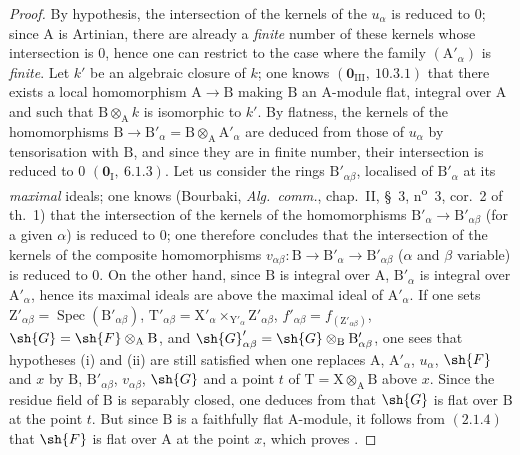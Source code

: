 \begin{proof}
By hypothesis, the intersection of the kernels of the $u_\alpha$ is reduced to $0$; since $\mathrm{A}$ is Artinian,
there are already a \emph{finite} number of these kernels whose intersection is $0$, hence one can
restrict to the case where the family $(\mathrm{A}'_\alpha)$ is \emph{finite}. Let $k'$ be an algebraic closure of $k$; one knows
$(\mathbf{0}_{\mathrm{III}},~10.3.1)$ that there exists a local homomorphism $\mathrm{A}\to\mathrm{B}$ making $\mathrm{B}$ an $\mathrm{A}$-module
flat, integral over $\mathrm{A}$ and such that $\mathrm{B}\otimes_\mathrm{A} k$ is isomorphic to $k'$.
By flatness, the kernels of the homomorphisms $\mathrm{B}\to\mathrm{B}'_\alpha=\mathrm{B}\otimes_\mathrm{A}\mathrm{A}'_\alpha$ are deduced from those of
$u_\alpha$ by tensorisation with $\mathrm{B}$, and since they are in finite number, their intersection is
reduced to $0$ $(\mathbf{0}_\mathrm{I},~6.1.3)$. Let us consider the rings $\mathrm{B}'_{\alpha\beta}$, localised of $\mathrm{B}'_\alpha$ at its \emph{maximal} ideals;
one knows (Bourbaki, \emph{Alg.\ comm.}, chap.~II, \S~3, n\textsuperscript{o}~3, cor.~2 of th.~1) that the intersection
of the kernels of the homomorphisms $\mathrm{B}'_\alpha\to\mathrm{B}'_{\alpha\beta}$ (for a given $\alpha$) is reduced to $0$; one therefore concludes
that the intersection of the kernels of the composite homomorphisms $v_{\alpha\beta}:\mathrm{B}\to\mathrm{B}'_\alpha\to\mathrm{B}'_{\alpha\beta}$ ($\alpha$ and
$\beta$ variable) is reduced to $0$. On the other hand, since $\mathrm{B}$ is integral over $\mathrm{A}$, $\mathrm{B}'_\alpha$ is integral over $\mathrm{A}'_\alpha$,
hence its maximal ideals are above the maximal ideal of $\mathrm{A}'_\alpha$. If one sets
$\mathrm{Z}'_{\alpha\beta}=\operatorname{Spec}(\mathrm{B}'_{\alpha\beta})$,
$\mathrm{T}'_{\alpha\beta}=\mathrm{X}'_\alpha\times_{\mathrm{Y}'_\alpha}\mathrm{Z}'_{\alpha\beta}$,
$f'_{\alpha\beta}=f_{(\mathrm{Z}'_{\alpha\beta})}$,
$\sh{G}=\sh{F}\otimes_\mathrm{A}\mathrm{B}$, and
$\sh{G}'_{\alpha\beta}=\sh{G}\otimes_\mathrm{B}\mathrm{B}'_{\alpha\beta}$, one sees
that hypotheses (i) and (ii) are still satisfied when one replaces
$\mathrm{A}$, $\mathrm{A}'_\alpha$, $u_\alpha$, $\sh{F}$ and $x$ by $\mathrm{B}$, $\mathrm{B}'_{\alpha\beta}$, $v_{\alpha\beta}$, $\sh{G}$ and a point $t$ of $\mathrm{T}=\mathrm{X}\otimes_\mathrm{A}\mathrm{B}$ above $x$.
Since the residue field of $\mathrm{B}$ is separably closed, one deduces from  that
$\sh{G}$ is flat over $\mathrm{B}$ at the point $t$. But since $\mathrm{B}$ is a faithfully flat $\mathrm{A}$-module, it follows from $(2.1.4)$
that $\sh{F}$ is flat over $\mathrm{A}$ at the point $x$, which proves .
\end{proof}


